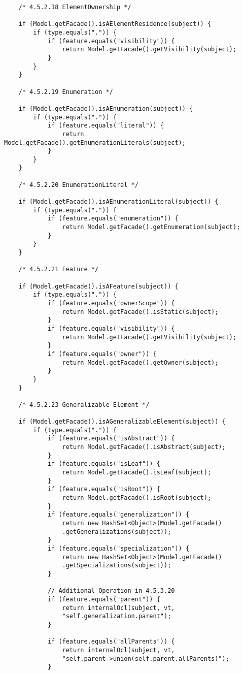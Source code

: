 \begin{mdframed}
\begin{lstlisting}
	/* 4.5.2.18 ElementOwnership */          
	
	if (Model.getFacade().isAElementResidence(subject)) {
		if (type.equals(".")) {
			if (feature.equals("visibility")) {
				return Model.getFacade().getVisibility(subject);
			}
		}
	}
	
	/* 4.5.2.19 Enumeration */          
	
	if (Model.getFacade().isAEnumeration(subject)) {
		if (type.equals(".")) {
			if (feature.equals("literal")) {
				return Model.getFacade().getEnumerationLiterals(subject);
			}
		}
	}
	
	/* 4.5.2.20 EnumerationLiteral */          
	
	if (Model.getFacade().isAEnumerationLiteral(subject)) {
		if (type.equals(".")) {
			if (feature.equals("enumeration")) {
				return Model.getFacade().getEnumeration(subject);
			}
		}
	}
	
	/* 4.5.2.21 Feature */          
	
	if (Model.getFacade().isAFeature(subject)) {
		if (type.equals(".")) {
			if (feature.equals("ownerScope")) {
				return Model.getFacade().isStatic(subject);
			}
			if (feature.equals("visibility")) {
				return Model.getFacade().getVisibility(subject);
			}
			if (feature.equals("owner")) {
				return Model.getFacade().getOwner(subject);
			}                
		}
	}        
	
	/* 4.5.2.23 Generalizable Element */          
	
	if (Model.getFacade().isAGeneralizableElement(subject)) {
		if (type.equals(".")) {
			if (feature.equals("isAbstract")) {
				return Model.getFacade().isAbstract(subject);
			}
			if (feature.equals("isLeaf")) {
				return Model.getFacade().isLeaf(subject);
			}
			if (feature.equals("isRoot")) {
				return Model.getFacade().isRoot(subject);
			}
			if (feature.equals("generalization")) {
				return new HashSet<Object>(Model.getFacade()
				.getGeneralizations(subject));
			}
			if (feature.equals("specialization")) {
				return new HashSet<Object>(Model.getFacade()
				.getSpecializations(subject));
			}
			
			// Additional Operation in 4.5.3.20                
			if (feature.equals("parent")) {
				return internalOcl(subject, vt,
				"self.generalization.parent");
			}                
			
			if (feature.equals("allParents")) {
				return internalOcl(subject, vt,
				"self.parent->union(self.parent.allParents)");
			}                
			

\end{lstlisting}
\end{mdframed}
